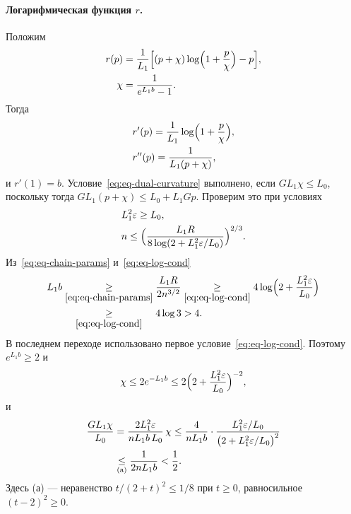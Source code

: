 \paragraph{Логарифмическая функция $r$.} Положим
\begin{equation}\label{eq:eq-log-reg}
\begin{aligned}
 r(p)&=\frac1{L_1}\Bigl[(p+\chi)\log\Bigl(1+\frac p\chi\Bigr)-p\Bigr],\\
 \chi&=\frac1{e^{L_1b}-1} .
\end{aligned}
\end{equation}
Тогда
\[
\begin{aligned}
 &r'(p)=\frac1{L_1}\log\Bigl(1+\frac p\chi\Bigr),\\
 &r''(p)=\frac1{L_1(p+\chi)},
\end{aligned}
\]
и $r'(1)=b$. Условие~\eqref{eq:eq-dual-curvature} выполнено, если $GL_1\chi\le L_0$, поскольку тогда $GL_1(p+\chi)\le L_0+L_1Gp$. Проверим это при условиях
\begin{equation}\label{eq:eq-log-cond}
\begin{aligned}
 &L_1^2\varepsilon\ge L_0,\\
 &n\le\Bigl(\frac{L_1R}{8\log(2+L_1^2\varepsilon/L_0)}\Bigr)^{2/3} .
\end{aligned}
\end{equation}
Из~\eqref{eq:eq-chain-params} и~\eqref{eq:eq-log-cond}
\begin{align*}
 L_1b
 &\by{\ge}{\eqref{eq:eq-chain-params}}\frac{L_1R}{2n^{3/2}}
 \by{\ge}{\eqref{eq:eq-log-cond}}4\log\Bigl(2+\frac{L_1^2\varepsilon}{L_0}\Bigr)\\
 &\bypad{\ge}{\eqref{eq:eq-log-cond}}{\eqref{eq:eq-chain-params}}4\log3>4 .
\end{align*}
В последнем переходе использовано первое условие~\eqref{eq:eq-log-cond}.
Поэтому $e^{L_1b}\ge2$ и
\[
 \chi\le2e^{-L_1b}\le2\Bigl(2+\frac{L_1^2\varepsilon}{L_0}\Bigr)^{-2},
\]
и
\begin{align*}
 \frac{GL_1\chi}{L_0}
 &=\frac{2L_1^2\varepsilon}{nL_1b\,L_0}\,\chi
 \le\frac4{nL_1b}\cdot\frac{L_1^2\varepsilon/L_0}{\bigl(2+L_1^2\varepsilon/L_0\bigr)^2}\\
 &\mathrel{\underset{(\mathrm a)}{\le}}\frac1{2nL_1b}<\frac12 .
\end{align*}
Здесь (а) --- неравенство $t/(2+t)^2\le1/8$ при $t\ge0$, равносильное $(t-2)^2\ge0$.


